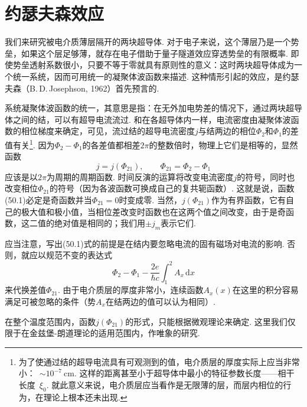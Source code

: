 \section{约瑟夫森效应}

我们来研究被电介质薄层隔开的两块超导体. 对于电子来说，这个薄层乃是一个势垒，如果这个层足够薄，就存在电子借助于量子隧道效应穿透势垒的有限概率. 即使势垒透射系数很小，只要不等于零就具有原则性的意义：这时两块超导体成为一个统一系统，因而可用统一的凝聚体波函数来描述. 这种情形引起的效应，是约瑟夫森（B.\,D.\,Josephson, 1962）首先预言的.

系统凝聚体波函数的统一，其意思是指：在无外加电势差的情况下，通过两块超导体之间的结，可以有超导电流流过. 和在各超导体内一样，电流密度由凝聚体波函数的相位梯度来确定，可见，流过结的超导电流密度$j$与结两边的相位$\Phi_2$和$\Phi_1$的差值有关\footnote{为了使通过结的超导电流具有可观测到的值，电介质层的厚度实际上应当非常小：~$\sim10^{-7}\ \mathrm{cm}$. 这样的距离甚至小于超导体中最小的特征参数长度——相干长度~$\xi_0$. 就此意义来说，电介质层应当看作是无限薄的层，而层内相位的行为，在理论上根本还未出现.}. 因为$\Phi_2-\Phi_1$的各差值都相差$2\pi$的整数倍时，物理上它们是相等的，显然函数
\begin{equation}
j=j(\Phi_{21}),\qquad \Phi_{21}=\Phi_2-\Phi_1
\end{equation}
应该是以$2\pi$为周期的周期函数. 时间反演的运算将改变电流密度$j$的符号，同时也改变相位$\Phi_{21}$的符号（因为各波函数可换成自己的复共轭函数）. 这就是说，函数(50.1)必定是奇函数并当$\Phi_{21}=0$时变成零. 当然，$j(\Phi_{21})$作为有界函数，它有自己的极大值和极小值，当相位差改变时函数也在这两个值之间改变，由于是奇函数，这二值的绝对值是相同的；我们用$\pm j_m$表示它们.

应当注意，写出(50.1)式的前提是在结内要忽略电流的固有磁场对电流的影响. 否则，就应以规范不变的表达式
\begin{equation*}
\Phi_2-\Phi_1-\frac{2e}{\hbar c}\int_1^2 A_x\,\mathrm{d}x
\end{equation*}
来代换差值$\Phi_{21}$. 由于电介质层的厚度非常小，连续函数$A_x(x)$在这里的积分容易满足可被忽略的条件（势$A_x$在结两边的值可以认为相同）.

在整个温度范围内，函数$j(\Phi_{21})$的形式，只能根据微观理论来确定. 这里我们仅限于在金兹堡-朗道理论的适用范围内，作唯象的研究.

